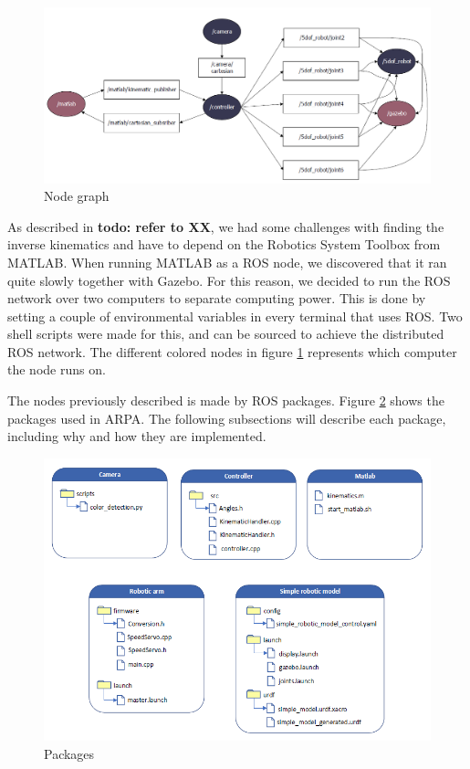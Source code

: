 \documentclass[11pt,a4paper, titlepage]{article}
\begin{document}
	\begin{figure}[H]
		\includegraphics[width=\linewidth]{../Diagrams/NodeGraph-v1.png}
		\caption{Node graph}
		\label{fig:nodegraph}
	\end{figure}
	
As described in \textbf{todo: refer to XX}, we had some challenges with finding the inverse kinematics and have to depend on the Robotics System Toolbox from MATLAB. When running MATLAB as a ROS node, we discovered that it ran quite slowly together with Gazebo. For this reason, we decided to run the ROS network over two computers to separate computing power. This is done by setting a couple of environmental variables in every terminal that uses ROS. Two shell scripts were made for this, and can be sourced to achieve the distributed ROS network. The different colored nodes in figure \ref{fig:nodegraph} represents which computer the node runs on.

	
The nodes previously described is made by ROS packages. Figure \ref{fig:dir-list} shows the packages used in ARPA. The following subsections will describe each package, including why and how they are implemented.

	\begin{figure}[H]
		\includegraphics[width=\linewidth]{../Diagrams/Packages.png}
		\caption{Packages}
		\label{fig:dir-list}
	\end{figure}
	
\end{document}
